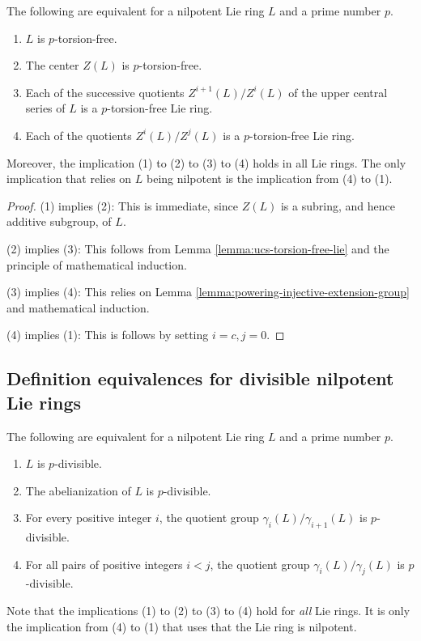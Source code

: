 \begin{theorem}\label{thm:torsion-free-equivalence-theorem-lie}
  The following are equivalent for a nilpotent Lie ring $L$ and a prime
  number $p$.

  \begin{enumerate}
  \item $L$ is $p$-torsion-free.
  \item The center $Z(L)$ is $p$-torsion-free.
  \item Each of the successive quotients $Z^{i+1}(L)/Z^i(L)$ of the
    upper central series of $L$ is a $p$-torsion-free Lie ring.
  \item Each of the quotients $Z^i(L)/Z^j(L)$ is a $p$-torsion-free Lie ring.
  \end{enumerate}

  Moreover, the implication (1) to (2) to (3) to (4) holds in
  all Lie rings. The only implication that relies on $L$ being nilpotent
  is the implication from (4) to (1).
\end{theorem}

\begin{proof}
  (1) implies (2): This is immediate, since $Z(L)$ is a subring, and hence
  additive subgroup, of $L$.

  (2) implies (3): This follows from Lemma
  \ref{lemma:ucs-torsion-free-lie} and the principle of mathematical
  induction.

  (3) implies (4): This relies on Lemma
  \ref{lemma:powering-injective-extension-group} and mathematical induction.

  (4) implies (1): This is follows by setting $i = c, j = 0$.
\end{proof}

\subsection{Definition equivalences for divisible nilpotent Lie rings}

\begin{theorem}\label{thm:divisibility-equivalence-theorem-lie}
  The following are equivalent for a nilpotent Lie ring $L$ and a prime
  number $p$.

  \begin{enumerate}
  \item $L$ is $p$-divisible.
  \item The abelianization of $L$ is $p$-divisible.
  \item For every positive integer $i$, the quotient group
    $\gamma_i(L)/\gamma_{i+1}(L)$ is $p$-divisible.
  \item For all pairs of positive integers $i < j$, the quotient group
    $\gamma_i(L)/\gamma_j(L)$ is $p$-divisible.
  \end{enumerate}

  Note that the implications (1) to (2) to (3) to (4) hold for {\em
    all} Lie rings. It is only the implication from (4) to (1) that
  uses that the Lie ring is nilpotent.
\end{theorem}

